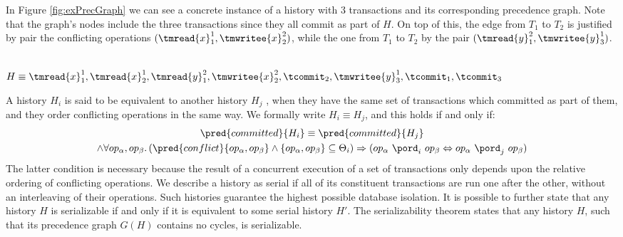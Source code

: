 In Figure \ref{fig:exPrecGraph} we can see a concrete instance of a history with $3$ transactions and its corresponding precedence graph. Note that the graph's nodes include the three transactions since they all commit as part of $H$. On top of this, the edge from $T_1$ to $T_2$ is justified by pair the conflicting operations $(\tmread{x}_1^1, \tmwritee{x}_2^2)$, while the one from $T_1$ to $T_2$ by the pair $(\tmread{y}_1^2, \tmwritee{y}_3^1)$.

\begin{center}
\\
$H \equiv \tmread{x}_1^1, \tmread{x}_2^1, \tmread{y}_1^2, \tmwritee{x}_2^2, \tcommit_2, \tmwritee{y}_3^1, \tcommit_1, \tcommit_3$
\label{fig:exPrecGraph}
\end{center}

A history $H_i$ is said to be equivalent to another history $H_j$ \cite{ccontrol}, when they have the same set of transactions which committed as part of them, and they order conflicting operations in the same way. We formally write $H_i \equiv H_j$, and this holds if and only if:
\begin{gather*}
	\pred{committed}{H_i} \equiv \pred{committed}{H_j} \\
	\land \forall op_\alpha, op_\beta \ldotp (\pred{conflict}{op_\alpha, op_\beta} \land \left\lbrace op_\alpha, op_\beta \right\rbrace \subseteq \Theta_i) \Rightarrow (op_\alpha\ \pord_i\ op_\beta \Leftrightarrow op_\alpha\ \pord_j\ op_\beta)
\end{gather*}
The latter condition is necessary because the result of a concurrent execution of a set of transactions only depends upon the relative ordering of conflicting operations. We describe a history as serial if all of its constituent transactions are run one after the other, without an interleaving of their operations. Such histories guarantee the highest possible database isolation. It is possible to further state that any history $H$ is serializable if and only if it is equivalent to some serial history $H'$. The serializability theorem \cite{ccontrol} states that any history $H$, such that its precedence graph $G(H)$ contains no cycles, is serializable.

